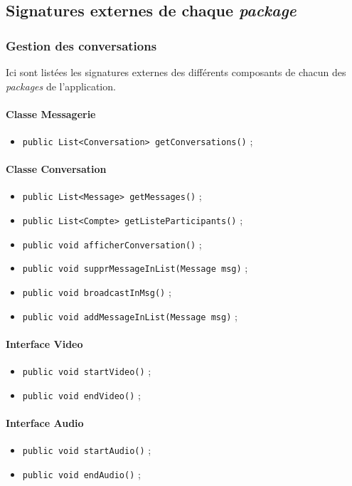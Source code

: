 \documentclass[11pt,dvipsnames,svgnames]{report}
\begin{document}
\subsection{Signatures externes de chaque \emph{package}}
\subsubsection{\og Gestion des conversations \fg}

Ici sont listées les signatures externes des différents composants de chacun des \emph{packages} de l'application.

\paragraph*{Classe Messagerie}
\begin{itemize}
\item \texttt{public List<Conversation> getConversations()} ;
\end{itemize}

\paragraph*{Classe Conversation}
\begin{itemize}
\item \texttt{public List<Message> getMessages()} ;
\item \texttt{public List<Compte> getListeParticipants()} ;
\item \texttt{public void afficherConversation()} ;
\item \texttt{public void supprMessageInList(Message msg)} ;
\item \texttt{public void broadcastInMsg()} ;
\item \texttt{public void addMessageInList(Message msg)} ;

\end{itemize}

\paragraph*{Interface Video}
\begin{itemize}
\item \texttt{public void startVideo()} ;
\item \texttt{public void endVideo()} ;
\end{itemize}

\paragraph*{Interface Audio}
\begin{itemize}
\item \texttt{public void startAudio()} ;
\item \texttt{public void endAudio()} ;
\end{itemize}
\end{document}
